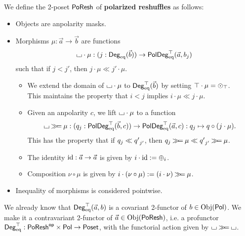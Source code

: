 \documentclass[a4paper]{memoir}
\begin{document}
\begin{definition}\label{def:poreshcat}
	We define the 2-poset $\poreshcat$ of \textbf{polarized reshuffles} as follows:
	\begin{itemize}
		\item Objects are anpolarity masks.
		\item Morphisms $\mu : \vec a \to \vec b$ are functions
		\[
			\loch \cdot \mu : (j : \Degeq(\vec b)) \to \poldegeqtop(\vec a, b_j)
		\]
		such that if $j < j'$, then $j \cdot \mu \ll j' \cdot \mu$.
		\begin{itemize}
			\item We extend the domain of $\loch \cdot \mu$ to $\Degeqtop(\vec b)$ by setting $\top \cdot \mu = \dpol \top \nonpol$. \\
			This maintains the property that $i < j$ implies $i \cdot \mu \ll j \cdot \mu$.
			\item Given an anpolarity $c$, we lift $\loch \cdot \mu$ to a function
			\[
				\loch \bindop \mu : (\dpol j q : \poldegeqtop(\vec b, c)) \to \poldegeqtop(\vec a, c) : \dpol j q \mapsto q \circ (j \cdot \mu).
			\]
			This has the property that if $\dpol j q \ll \dpol{{j'}}{q'}$, then $\dpol j q \bindop \mu \ll \dpol{{j'}}{q'} \bindop \mu$.
			\item The identity $\id : \vec a \to \vec a$ is given by $i \cdot \id := \dpol i \pospol$.
			\item Composition $\nu \circ \mu$ is given by $i \cdot (\nu \circ \mu) := (i \cdot \nu) \bindop \mu$.
		\end{itemize}
		\item Inequality of morphisms is considered pointwise.
	\end{itemize}
\end{definition}
\begin{definition}
	We already know that $\Degeqtop(\vec a, b)$ is a covariant 2-functor of $b \in \Obj(\polsymbol)$. We make it a contravariant 2-functor of $\vec a \in \Obj(\poreshcat)$, i.e. a profunctor $\Degeqtop : \poreshcat\op \times \polsymbol \to \Poset$, with the functorial action given by $\loch \bindop \loch$.
\end{definition}
\end{document}
